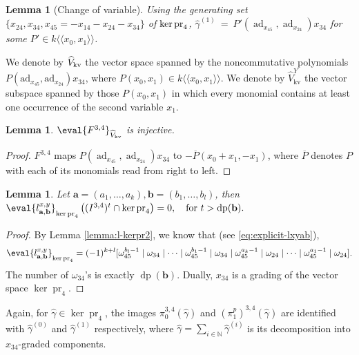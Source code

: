 \documentclass[a4paper,fleqn]{cas-sc}
\newtheorem{lemma}[theorem]{Lemma}
\DeclareMathOperator{\dpt}{dp}
\DeclareMathOperator{\pr}{pr}
\DeclareMathOperator{\ad}{ad}
\begin{document}
\begin{lemma}[Change of variable] \label{lemma:change-var-P}
Using the generating set $\{x_{24}, x_{34}, x_{45}=-x_{14}-x_{24}-x_{34}\}$ of $\ker \rm{pr}_4$,
$
\widehat{\gamma}^{(1)}~=~P'(\ad_{x_{45}},\ad_{x_{24}})x_{34}
$
for some $P'\in k\langle\langle x_0,x_1\rangle\rangle$. 
\end{lemma}

We denote by $\widehat{V}_{\rm{kv}}$ the vector space spanned by the noncommutative polynomials $P(\text{ad}_{x_{45}},\text{ad}_{x_{24}})x_{34}$, where $ P(x_0,x_1)\in k\langle\langle x_0,x_1\rangle\rangle$. We denote by $\widehat{V}_{\mathrm{kv}}^Y$ the vector subspace spanned by those $P(x_0,x_1)$ in which every monomial contains at least one occurrence of the second variable $x_1$.

\begin{lemma}\label{lemma:F_injective34}
	$\eval{F^{3,4}}_{\widehat{V}_{\rm{kv}}}$ is injective.
\end{lemma}
\begin{proof}
	$F^{3,4}$ maps $P(\ad_{x_{45}},\ad_{x_{24}})x_{34}$ to  $-\overline{P}(x_0+x_1,-x_1)$, where $\overline{P}$ denotes $P$ with each of its monomials read from right to left.
\end{proof}

\begin{lemma} 
Let $\textbf{a}=(a_1, \ldots, a_k),\textbf{b}=(b_1, \ldots, b_l)$, then
$
		\eval{l^{x,y}_{\bf{a},\bf{b}}}_{\ker \pr_4} \left( (I^{3,4})^t\cap \ker \pr_4 \right)=0,\quad \text{for } t> \dpt(\bf{b}).
$
\end{lemma}
\begin{proof}
By Lemma \ref{lemma:l-kerpr2}, we know that (see \eqref{eq:explicit-lxyab}), 
\[
\eval{l^{x,y}_{\bf{a},\bf{b}}}_{\ker \pr_4}=(-1)^{k+l}[\omega^{b_l-1}_{45} \mid \omega_{34} \mid \dots \mid \omega^{b_1-1}_{45} \mid \omega_{34} \mid \omega^{a_k-1}_{45} \mid \omega_{24} \mid \dots \mid \omega^{a_1-1}_{45} \mid \omega_{24}].
\]
The number of $\omega_{34}$'s is exactly $\dpt(\textbf{b})$. Dually, $x_{34}$ is a grading of the vector space $\ker \pr_4$.
\end{proof}

Again, for $\widehat{\gamma} \in \ker \pr_4$, the images $\pi_0^{3,4}(\widehat{\gamma})$ and $(\pi_1^p)^{3,4}(\widehat{\gamma})$ are identified with $\widehat{\gamma}^{(0)}$ and $\widehat{\gamma}^{(1)}$ respectively, where $\widehat{\gamma} = \sum_{i \in \mathbb{N}} \widehat{\gamma}^{(i)}$ is its decomposition into $x_{34}$-graded components.
\end{document}
